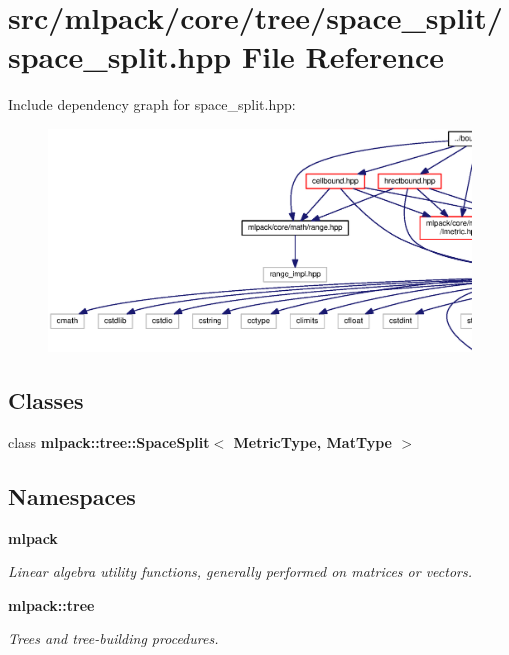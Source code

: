 \section{src/mlpack/core/tree/space\+\_\+split/space\+\_\+split.hpp File Reference}
\label{space__split_8hpp}
Include dependency graph for space\+\_\+split.\+hpp\+:
\nopagebreak
\begin{figure}[H]
\begin{center}
\leavevmode
\includegraphics[width=350pt]{space__split_8hpp__incl}
\end{center}
\end{figure}
\subsection*{Classes}
\begin{DoxyCompactItemize}
\item 
class {\bf mlpack\+::tree\+::\+Space\+Split$<$ Metric\+Type, Mat\+Type $>$}
\end{DoxyCompactItemize}
\subsection*{Namespaces}
\begin{DoxyCompactItemize}
\item 
 {\bf mlpack}
\begin{DoxyCompactList}\small\item\em Linear algebra utility functions, generally performed on matrices or vectors. \end{DoxyCompactList}\item 
 {\bf mlpack\+::tree}
\begin{DoxyCompactList}\small\item\em Trees and tree-\/building procedures. \end{DoxyCompactList}\end{DoxyCompactItemize}


